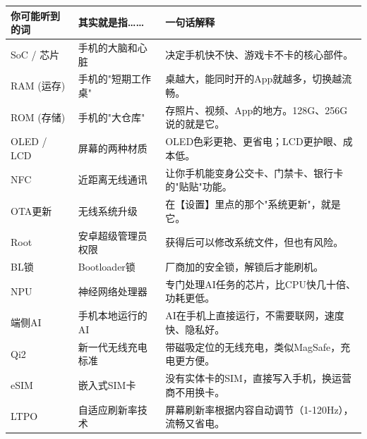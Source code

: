 
\begin{center}
\begin{tabularx}{\linewidth}{|X|X|X|}
\hline
\textbf{你可能听到的词} & \textbf{其实就是指……} & \textbf{一句话解释} \tabularnewline
\hline
SoC / 芯片 & 手机的大脑和心脏 & 决定手机快不快、游戏卡不卡的核心部件。 \tabularnewline
RAM (运存) & 手机的"短期工作桌" & 桌越大，能同时开的App就越多，切换越流畅。 \tabularnewline
ROM (存储) & 手机的"大仓库" & 存照片、视频、App的地方。128G、256G说的就是它。 \tabularnewline
OLED / LCD & 屏幕的两种材质 & OLED色彩更艳、更省电；LCD更护眼、成本低。 \tabularnewline
NFC & 近距离无线通讯 & 让你手机能变身公交卡、门禁卡、银行卡的"贴贴"功能。 \tabularnewline
OTA更新 & 无线系统升级 & 在【设置】里点的那个"系统更新"，就是它。 \tabularnewline
Root & 安卓超级管理员权限 & 获得后可以修改系统文件，但也有风险。 \tabularnewline
BL锁 & Bootloader锁 & 厂商加的安全锁，解锁后才能刷机。 \tabularnewline
NPU & 神经网络处理器 & 专门处理AI任务的芯片，比CPU快几十倍、功耗更低。 \tabularnewline
端侧AI & 手机本地运行的AI & AI在手机上直接运行，不需要联网，速度快、隐私好。 \tabularnewline
Qi2 & 新一代无线充电标准 & 带磁吸定位的无线充电，类似MagSafe，充电更方便。 \tabularnewline
eSIM & 嵌入式SIM卡 & 没有实体卡的SIM，直接写入手机，换运营商不用换卡。 \tabularnewline
LTPO & 自适应刷新率技术 & 屏幕刷新率根据内容自动调节（1-120Hz），流畅又省电。 \tabularnewline
\hline
\end{tabularx}
\end{center}
